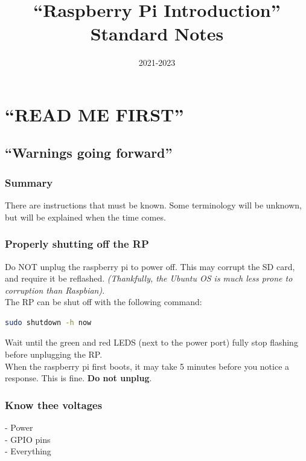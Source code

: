 \documentclass[a4paper, 10pt]{article}
\title{``Raspberry Pi Introduction'' Standard Notes}
\date{2021-2023}
\begin{document}
\maketitle

\pagebreak

\tableofcontents
\pagebreak

\section{``READ ME FIRST''}
	\subsection*{``Warnings going forward''}
		\subsubsection*{Summary}
		There are instructions that must be known. Some terminology will be unknown, but will be explained when the time comes. 
	
		\subsubsection{Properly shutting off the RP}
            Do NOT unplug the raspberry pi to power off. This may corrupt the SD card, and require it be reflashed. 
            \textit{(Thankfully, the Ubuntu OS is much less prone to corruption than Raspbian)}.\\

            The RP can be shut off with the following command:
            \begin{lstlisting}[language=bash]
                sudo shutdown -h now
            \end{lstlisting}       
            Wait until the green and red LEDS (next to the power port) fully stop flashing before unplugging the RP.\\

            When the raspberry pi first boots, it may take 5 minutes before you notice a response. This is fine. \textbf{Do not unplug}.

		\subsubsection{Know thee voltages}
            - Power\\
            - GPIO pins\\
            - Everything\\
\end{document}
